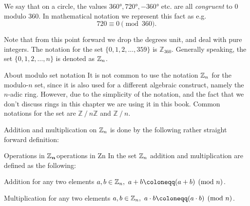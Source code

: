 We say that on a circle, the values $\ang{360}, \ang{720}, -\ang{360}$ etc. are all \emph{congruent} to $0$ modulo $360$. In mathematical notation we represent this fact as e.g.
\begin{equation}
	720 \equiv 0 \pmod{360}.
	\label{eq:mod 360}
\end{equation}

Note that from this point forward we drop the degrees unit, and deal with pure integers.
The notation for the set $\{0,1,2,\dots,359\}$ is $\mathbb{Z}_{360}$. Generally speaking, the set $\{0,1,2,\dots,n\}$ is denoted as $\mathbb{Z}_{n}$.

\begin{note}{About modulo set notation}{}
	It is not common to use the notation $\mathbb{Z}_{n}$ for the modulo-$n$ set, since it is also used for a different algebraic construct, namely the $n$-adic ring. However, due to the simplicity of the notation, and the fact that we don't discuss rings in this chapter we are using it in this book. Common notations for the set are $\mathbb{Z}\mathbin{/} n\mathbb{Z}$ and $\mathbb{Z}\mathbin{/} n$.
\end{note}

Addition and multiplication on $\mathbb{Z}_{n}$ is done by the following rather straight forward definition:
\begin{definition}{Operations in $\bm{\mathbb{Z}_{n}}$}{operations in Zn}
	In the set $\mathbb{Z}_{n}$ addition and multiplication are defined as the following:
	\begin{descitemize}
	\item[Addition] for any two elements $a,b\in\Z{n},\ a+b\coloneqq(a+b)\pmod{n}$.
	\item[Multiplication] for any two elements $a,b\in\Z{n},\ a\cdot b\coloneqq(a\cdot b)\pmod{n}$.
	\end{descitemize}
\end{definition}


